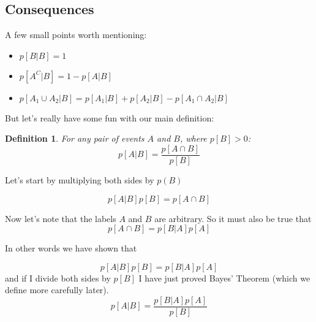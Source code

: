 \documentclass[12pt]{extbook}
\newtheorem{df}{Definition}[section]
\begin{document}


 
\subsection{Consequences}

A few small points worth mentioning:

\begin{itemize}
\item $p[B|B] = 1$
\item $p[A^C|B] = 1 - p[A|B]$
\item $p[A_1 \cup A_2 | B] = p[A_1|B] + p[A_2|B] - p[A_1 \cap A_2 | B]$
\end{itemize}

But let's really have some fun with our main definition:



\begin{df}
For any pair of events $A$ and $B$, where $p[B] > 0$:
\begin{displaymath}
p[A|B] = \frac{p[A \cap B]}{p[B]}
\end{displaymath}
\end{df}


 

Let's start by multiplying both sides by $p(B)$

\begin{displaymath}
p[A|B]p[B] = p[A \cap B]
\end{displaymath}

Now let's note that the labels $A$ and $B$ are arbitrary.   So it must also be true that
\begin{displaymath}
p[A \cap B] = p[B|A]p[A]
\end{displaymath}

In other words we have shown that

\begin{displaymath}
p[A|B]p[B] =  p[B|A]p[A]
\end{displaymath}
and if I divide both sides by $p[B]$ I have just proved Bayes' Theorem (which we define more carefully later).
\begin{displaymath}
p[A|B] = \frac{p[B|A]p[A]}{p[B]}
\end{displaymath}
\end{document}
